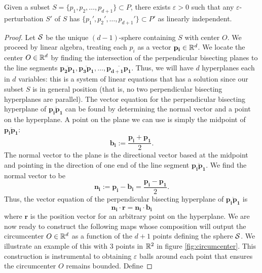 \documentclass[letterpaper,titlepage]{article}
\begin{document}
    \begin{lem}\label{affine_indep_lemma}
        Given a subset $S= \{p_1,p_2,\dots,p_{d+1}\} \subset P$, there exists $\varepsilon>0$ such that any $\varepsilon$-perturbation $S'$ of $S$ has $\{p_1',p_2',\dots,p_{d+1}'\} \subset P'$ as linearly independent.
    \end{lem}
    \begin{proof}
        Let $\mathcal{S}$ be the unique $(d-1)$-sphere containing $S$ with center $O$. We proceed by linear algebra, treating each $p_i$ as a vector $\mathbf{p_i} \in \mathbb{R}^d$. We locate the center $O \in \mathbb{R}^d$ by finding the intersection of the perpendicular bisecting planes to the line segments $\overline{\mathbf{p_2}\mathbf{p_1}}, \overline{\mathbf{p_3}\mathbf{p_1}}, \dots, \overline{\mathbf{p_{d+1}}\mathbf{p_1}}$.
        Thus, we will have $d$ hyperplanes each in $d$ variables: this is a system of linear equations that has a solution since our subset $S$ is in general position (that is, no two perpendicular bisecting hyperplanes are parallel). The vector equation for the perpendicular bisecting hyperplane of $\overline{\mathbf{p_i}\mathbf{p_1}}$ can be found by determining the normal vector and a point on the hyperplane. A point on the plane we can use is simply the midpoint of $\overline{\mathbf{p_i}\mathbf{p_1}}$:
        $$\mathbf{b_i} := \frac{\mathbf{p_i}+\mathbf{p_1}}{2}.$$
        The normal vector to the plane is the directional vector based at the midpoint and pointing in the direction of one end of the line segment $\overline{\mathbf{p_i}\mathbf{p_1}}$. We find the normal vector to be
        $$\mathbf{n_i} := \mathbf{p_i}-\mathbf{b_i} = \frac{\mathbf{p_i}-\mathbf{p_1}}{2}.$$
        Thus, the vector equation of the perpendicular bisecting hyperplane of $\overline{\mathbf{p_i}\mathbf{p_1}}$ is
        $$\mathbf{n_i}\cdot \mathbf{r}=\mathbf{n_i}\cdot\mathbf{b_i}$$
        where $\mathbf{r}$ is the position vector for an arbitrary point on the hyperplane.
        \newline
        We are now ready to construct the following maps whose composition will output the circumcenter $O \in \mathbb{R}^d$ as a function of the $d+1$ points defining the sphere $\mathcal{S}$. We illustrate an example of this with 3 points in $\mathbb{R}^2$ in figure \ref{fig:circumcenter}. This construction is instrumental to obtaining $\varepsilon$ balls around each point that ensures the circumcenter $O$ remains bounded. Define


\end{proof}
\end{document}
